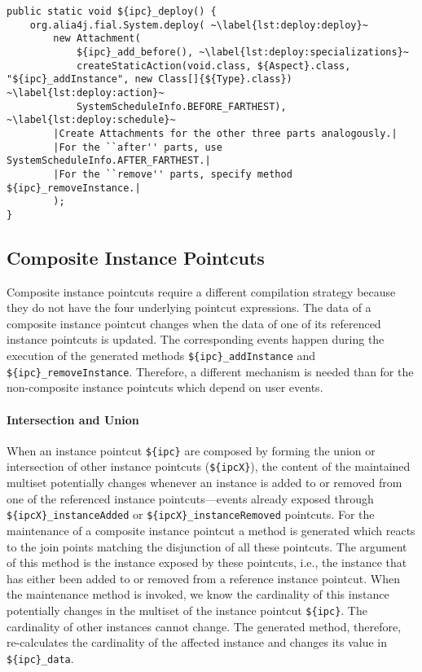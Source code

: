 \begin{lstlisting}[float,caption={Deployment of the bookkeeping for an instance pointcut.},label=lst:deployment]
public static void ${ipc}_deploy() {
	org.alia4j.fial.System.deploy( ~\label{lst:deploy:deploy}~
		new Attachment(
			${ipc}_add_before(), ~\label{lst:deploy:specializations}~
			createStaticAction(void.class, ${Aspect}.class, "${ipc}_addInstance", new Class[]{${Type}.class}) ~\label{lst:deploy:action}~
			SystemScheduleInfo.BEFORE_FARTHEST), ~\label{lst:deploy:schedule}~
		|Create Attachments for the other three parts analogously.|
		|For the ``after'' parts, use SystemScheduleInfo.AFTER_FARTHEST.|
		|For the ``remove'' parts, specify method ${ipc}_removeInstance.|
		);
}
\end{lstlisting}

\subsection{Composite Instance Pointcuts}

Composite instance pointcuts require a different compilation strategy because they do not have the four underlying pointcut expressions.
The data of a composite instance pointcut changes when the data of one of its referenced instance pointcuts is updated.
The corresponding events happen during the execution of the generated methods \lstinline!${ipc}_addInstance! and \lstinline!${ipc}_removeInstance!.
Therefore, a different mechanism is needed than for the non-composite instance pointcuts which depend on user events.

\paragraph{Intersection and Union}

When an instance pointcut \lstinline!${ipc}! are composed by forming the union or intersection of other instance pointcuts (\lstinline!${ipcX}!), the content of the maintained multiset potentially changes whenever an instance is added to or removed from one of the referenced instance pointcuts---events already exposed through \lstinline!${ipcX}_instanceAdded! or \newline\lstinline!${ipcX}_instanceRemoved! pointcuts.
For the maintenance of a composite instance pointcut a method is generated which reacts to the join points matching the disjunction of all these pointcuts.
The argument of this method is the instance exposed by these pointcuts, i.e., the instance that has either been added to or removed from a reference instance pointcut.
When the maintenance method is invoked, we know the cardinality of this instance potentially changes in the multiset of the instance pointcut \lstinline!${ipc}!.
The cardinality of other instances cannot change.
The generated method, therefore, re-calculates the cardinality of the affected instance and changes its value in \lstinline!${ipc}_data!.

